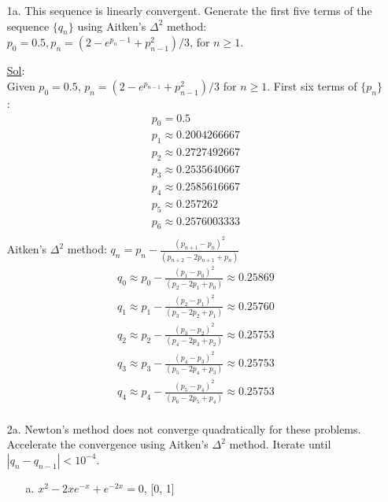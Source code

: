 \begin{enumerate}
  \item[1a.] This sequence is linearly convergent. Generate the first
    five terms of the sequence \( \lbrace q_n \rbrace \) using
    Aitken's \( \Delta^2 \) method: \( p_0 = 0.5, p_n = (2 - e^{p_n
    -1} + p^2_{n-1})/3 \), for \( n \ge 1 \).

    \underline{Sol}:\\
    Given \( p_0 = 0.5 \), \( p_n = (2 - e^{p_{n-1}} + p^2_{n-1})/3
    \) for \( n \ge 1 \).
    First six terms of \( \{ p_n \} \):
    \[
      \begin{array}{l}
        p_0 = 0.5 \\
        p_1 \approx 0.2004266667 \\
        p_2 \approx 0.2727492667 \\
        p_3 \approx 0.2535640667 \\
        p_4 \approx 0.2585616667 \\
        p_5 \approx 0.257262 \\
        p_6 \approx 0.2576003333 \\
      \end{array}
    \]
    Aitken's \( \Delta^2 \) method: \( q_n = p_n - \frac{(p_{n+1} -
    p_n)^2}{(p_{n+2} - 2p_{n+1} + p_n)} \)
    \[
      \begin{array}{l}
        q_0 \approx p_0 - \frac{(p_1 - p_0)^2}{(p_2 - 2p_1 + p_0)}
        \approx 0.25869 \\
        q_1 \approx p_1 - \frac{(p_2 - p_1)^2}{(p_3 - 2p_2 + p_1)}
        \approx 0.25760 \\
        q_2 \approx p_2 - \frac{(p_3 - p_2)^2}{(p_4 - 2p_3 + p_2)}
        \approx 0.25753 \\
        q_3 \approx p_3 - \frac{(p_4 - p_3)^2}{(p_5 - 2p_4 + p_3)}
        \approx 0.25753 \\
        q_4 \approx p_4 - \frac{(p_5 - p_4)^2}{(p_6 - 2p_5 + p_4)}
        \approx 0.25753 \\
      \end{array}
    \]


  \item[2a.] Newton's method does not converge quadratically for
    these problems. Accelerate the convergence using Aitken's \(
    \Delta^2 \) method. Iterate until \( |q_n - q_{n-1}| < 10^{-4} \).
    \begin{enumerate}
      \item[a.] \( x^2 - 2xe^{-x} + e^{-2x} = 0 \), [0, 1]


\end{enumerate}
\end{enumerate}
